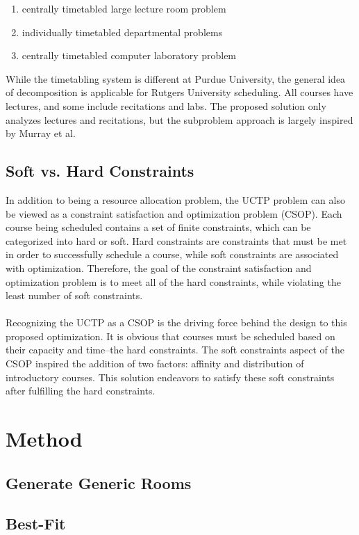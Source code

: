 \documentclass{acm_proc_article-sp}
\begin{document}
\begin{enumerate}
	\item centrally timetabled large lecture room problem
	\item individually timetabled departmental problems
	\item centrally timetabled computer laboratory problem
\end{enumerate}

While the timetabling system is different at Purdue University, the general
idea of decomposition is applicable for Rutgers University scheduling. All
courses have lectures, and some include recitations and labs. The proposed
solution only analyzes lectures and recitations, but the subproblem approach is
largely inspired by Murray et al.

\subsection{Soft vs. Hard Constraints}
In addition to being a resource allocation problem, the UCTP problem can also
be viewed as a constraint satisfaction and optimization problem (CSOP). Each
course being scheduled contains a set of finite constraints, which can be
categorized into hard or soft. Hard constraints are constraints that must be
met in order to successfully schedule a course, while soft constraints are
associated with optimization. Therefore, the goal of the constraint
satisfaction and optimization problem is to meet all of the hard constraints,
while violating the least number of soft constraints.
\\\\
Recognizing the UCTP as a CSOP is the driving force behind the design to this
proposed optimization. It is obvious that courses must be scheduled based on
their capacity and time--the hard constraints. The soft constraints aspect of
the CSOP inspired the addition of two factors: affinity and distribution of
introductory courses. This solution endeavors to satisfy these soft constraints
after fulfilling the hard constraints.

\section{Method}
	\subsection{Generate Generic Rooms}
	
	\subsection{Best-Fit}
\end{document}
